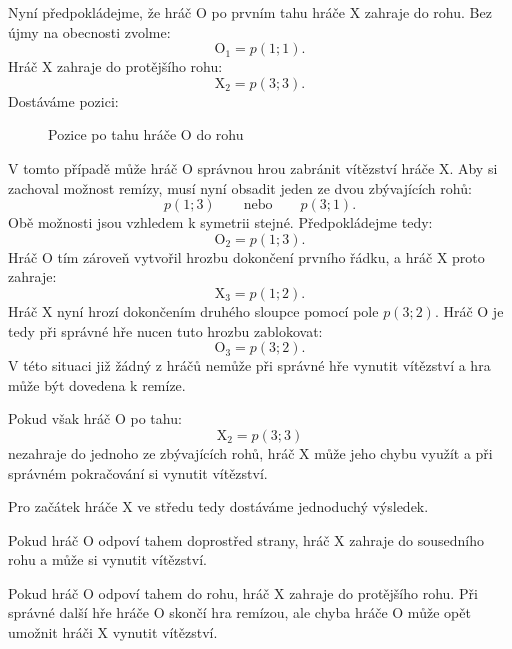 \documentclass[12pt,a4paper]{article}
\begin{document}
Nyní předpokládejme, že hráč $\mathrm{O}$ po prvním tahu hráče $\mathrm{X}$ zahraje do rohu.
Bez újmy na obecnosti zvolme:
\[
    \mathrm{O}_1=p(1;1).
\]
Hráč $\mathrm{X}$ zahraje do protějšího rohu:
\[
    \mathrm{X}_2=p(3;3).
\]
Dostáváme pozici:
\begin{figure}[h]
    \begin{center}
    \end{center}

    \caption{Pozice po tahu hráče $\mathrm{O}$ do rohu}
    \label{fig:TicTacToeStrategieXStredRoh}
\end{figure}
V tomto případě může hráč $\mathrm{O}$ správnou hrou zabránit vítězství hráče $\mathrm{X}$.
Aby si zachoval možnost remízy, musí nyní obsadit jeden ze dvou zbývajících rohů:
\[
    p(1;3)
    \qquad\text{nebo}\qquad
    p(3;1).
\]
Obě možnosti jsou vzhledem k symetrii stejné.
Předpokládejme tedy:
\[
    \mathrm{O}_2=p(1;3).
\]
Hráč $\mathrm{O}$ tím zároveň vytvořil hrozbu dokončení prvního řádku, 
a hráč $\mathrm{X}$ proto zahraje:
\[
    \mathrm{X}_3=p(1;2).
\]
Hráč $\mathrm{X}$ nyní hrozí dokončením druhého sloupce pomocí pole $p(3;2)$.
Hráč $\mathrm{O}$ je tedy při správné hře nucen tuto hrozbu zablokovat:
\[
    \mathrm{O}_3=p(3;2).
\]
V této situaci již žádný z hráčů nemůže při správné hře vynutit vítězství 
a hra může být dovedena k remíze.

Pokud však hráč $\mathrm{O}$ po tahu:
\[
    \mathrm{X}_2=p(3;3)
\]
nezahraje do jednoho ze zbývajících rohů, 
hráč $\mathrm{X}$ může jeho chybu využít a při správném pokračování si vynutit vítězství.

Pro začátek hráče $\mathrm{X}$ ve středu tedy dostáváme jednoduchý výsledek.

Pokud hráč $\mathrm{O}$ odpoví tahem doprostřed strany, 
hráč $\mathrm{X}$ zahraje do sousedního rohu a může si vynutit vítězství.

Pokud hráč $\mathrm{O}$ odpoví tahem do rohu,
hráč $\mathrm{X}$ zahraje do protějšího rohu.
Při správné další hře hráče $\mathrm{O}$ skončí hra remízou, 
ale chyba hráče $\mathrm{O}$ může opět umožnit hráči $\mathrm{X}$ vynutit vítězství.
\end{document}
